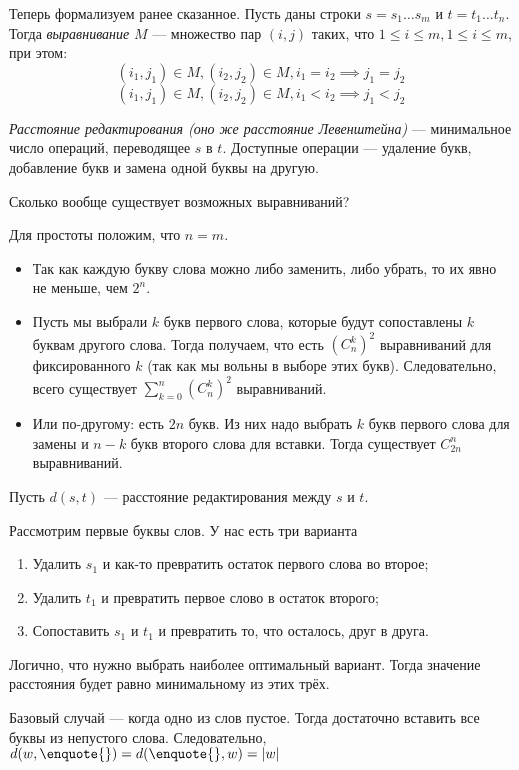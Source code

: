 Теперь формализуем ранее сказанное. Пусть даны строки $s = s_1\ldots s_m$ и $t = t_1\ldots t_n$. Тогда \emph{выравнивание} $M$ --- множество пар $(i,j)$ таких, что $1 \leqslant i \leqslant m, 1 \leqslant i \leqslant m$, при этом:
\[(i_1, j_1)\in M, (i_2, j_2)\in M, i_1 = i_2 \implies j_1 = j_2\]
\[(i_1, j_1)\in M, (i_2, j_2)\in M, i_1 < i_2 \implies j_1 < j_2\]

\emph{Расстояние редактирования (оно же расстояние Левенштейна)} --- минимальное число операций, переводящее $s$ в $t$. Доступные операции --- удаление букв, добавление букв и замена одной буквы на другую.

Сколько вообще существует возможных выравниваний?

Для простоты положим, что \(n = m\).

\begin{itemize}
	\item Так как каждую букву слова можно либо заменить, либо убрать, то их явно не меньше, чем $2^{n}$.
	\item Пусть мы выбрали $k$ букв первого слова, которые будут сопоставлены \(k\) буквам другого слова. Тогда получаем, что есть \((C_{n}^{k})^{2}\) выравниваний для фиксированного \(k\) (так как мы вольны в выборе этих букв). Следовательно, всего существует \(\sum\limits_{k = 0}^{n} (C_{n}^{k})^{2}\) выравниваний.
	\item Или по-другому: есть \(2n\) букв. Из них надо выбрать \(k\) букв первого слова для замены и \(n - k\) букв второго слова для вставки. Тогда существует \(C_{2n}^{n}\) выравниваний.
\end{itemize} 

Пусть $d(s, t)$ --- расстояние редактирования между $s$ и $t$.

Рассмотрим первые буквы слов. У нас есть три варианта
\begin{enumerate}
	\item Удалить $s_1$ и как-то превратить остаток первого слова во второе;
	\item Удалить $t_1$ и превратить первое слово в остаток второго;
	\item Сопоставить $s_1$ и $t_1$ и превратить то, что осталось, друг в друга.
\end{enumerate}

Логично, что нужно выбрать наиболее оптимальный вариант. Тогда значение расстояния будет равно минимальному из этих трёх.

Базовый случай --- когда одно из слов пустое. Тогда достаточно вставить все буквы из непустого слова. Следовательно, $d(w, \text{\enquote{}}) = d(\text{\enquote{}}, w) = |w|$

